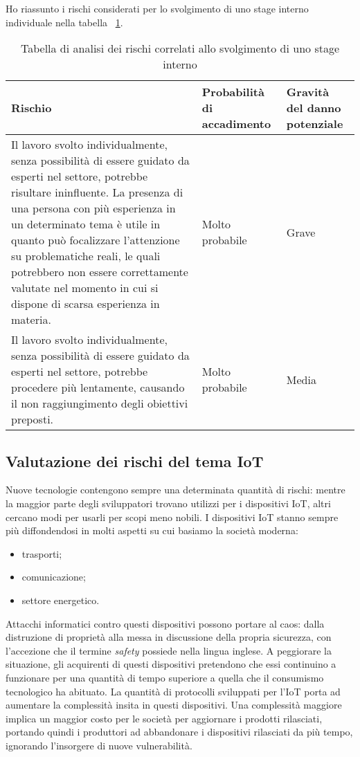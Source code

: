 Ho riassunto i rischi considerati per lo svolgimento di uno stage interno individuale nella tabella ~\ref{tab:rischi-stage-interno}.

\begin{table}
\caption{Tabella di analisi dei rischi correlati allo svolgimento di uno stage interno}
\label{tab:rischi-stage-interno}
\begin{tabularx}{\linewidth}{|p{7.5cm}|X|X|}
\hline
\textbf{Rischio} & \textbf{Probabilità di accadimento} & \textbf{Gravità del danno potenziale}\\
\hline
Il lavoro svolto individualmente, senza possibilità di essere guidato da esperti nel settore, potrebbe risultare ininfluente. La presenza di una persona con più esperienza in un determinato tema è utile in quanto può focalizzare l'attenzione su problematiche reali, le quali potrebbero non essere correttamente valutate nel momento in cui si dispone di scarsa esperienza in materia. & Molto probabile & Grave \\
\hline
Il lavoro svolto individualmente, senza possibilità di essere guidato da esperti nel settore, potrebbe procedere più lentamente, causando il non raggiungimento degli obiettivi preposti. & Molto probabile & Media \\
\hline
\end{tabularx}
\end{table}


\subsection{Valutazione dei rischi del tema IoT}

Nuove tecnologie contengono sempre una determinata quantità di rischi: mentre la maggior parte degli sviluppatori trovano utilizzi per i dispositivi IoT,
altri cercano modi per usarli per scopi meno nobili.
I dispositivi IoT stanno sempre più diffondendosi in molti aspetti su cui basiamo la società moderna:
\begin{itemize}
  \item trasporti;
  \item comunicazione;
  \item settore energetico.
\end{itemize}


Attacchi informatici contro questi dispositivi possono portare al caos: dalla distruzione di proprietà alla messa in discussione della propria sicurezza, con l'accezione che il termine \emph{safety} possiede nella lingua inglese.
A peggiorare la situazione, gli acquirenti di questi dispositivi pretendono che essi continuino a funzionare per una quantità di tempo superiore a quella che il consumismo tecnologico ha abituato.
La quantità di protocolli sviluppati per l'IoT porta ad aumentare la complessità insita in questi dispositivi.
Una complessità maggiore implica un maggior costo per le società per aggiornare i prodotti rilasciati, portando quindi i produttori ad abbandonare i dispositivi rilasciati da più tempo, ignorando l'insorgere di nuove vulnerabilità.

